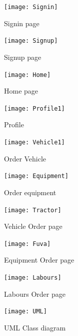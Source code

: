 \documentclass[conference]{IEEEtran}
\begin{document}
\begin{figure}[h!]
\centering
\texttt{[image: Signin]}
\caption{Signin page}
\label{fig:Signin}
\end{figure}



\begin{figure}[h!]
\centering
\texttt{[image: Signup]}
\caption{Signup page}
\label{fig:Signup}
\end{figure}


\begin{figure}[h!]
\centering
\texttt{[image: Home]}
\caption{Home page}
\label{fig:Home}
\end{figure}

\begin{figure}[h!]
\centering
\texttt{[image: Profile1]}
\caption{Profile}
\label{fig:Profile1}
\end{figure}


\begin{figure}[h!]
\centering
\texttt{[image: Vehicle1]}
\caption{Order Vehicle}
\label{fig:Vehicle1}
\end{figure}

\begin{figure}[h!]
\centering
\texttt{[image: Equipment]}
\caption{Order equipment}
\label{fig:Equipment}
\end{figure}

\begin{figure}[h!]
\centering
\texttt{[image: Tractor]}
\caption{Vehicle Order page}
\label{fig:Tractor}
\end{figure}

\begin{figure}[h!]
\centering
\texttt{[image: Fuva]}
\caption{Equipment Order page}
\label{fig:Fuva}
\end{figure}

\begin{figure}[h!]
\centering
\texttt{[image: Labours]}
\caption{Labours Order page}
\label{fig:Labours}
\end{figure}
\newpage





\begin{figure}[h!]
\centering
\texttt{[image: UML]}
\caption{UML Class diagram}
\label{fig:UML}
\end{figure}
\end{document}
